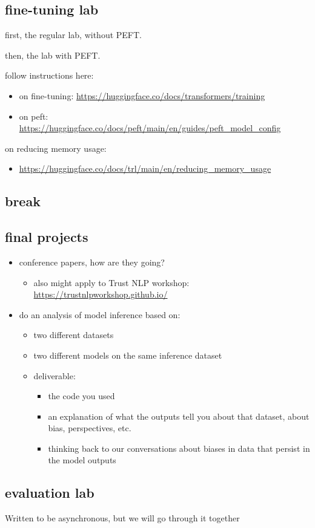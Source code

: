 \documentclass[11pt]{article}
\begin{document}
\subsection{fine-tuning lab}
\label{sec:orge7ab9a6}
first, the regular lab, without PEFT.

then, the lab with PEFT. 

follow instructions here:
\begin{itemize}
\item on fine-tuning: \url{https://huggingface.co/docs/transformers/training}
\item on peft:
\url{https://huggingface.co/docs/peft/main/en/guides/peft\_model\_config}
\end{itemize}

on reducing memory usage:
\begin{itemize}
\item \url{https://huggingface.co/docs/trl/main/en/reducing\_memory\_usage}
\end{itemize}


\subsection{break}
\label{sec:org887bc90}

\subsection{final projects}
\label{sec:org1897cac}
\begin{itemize}
\item conference papers, how are they going? 
\begin{itemize}
\item also might apply to Trust NLP workshop:
\url{https://trustnlpworkshop.github.io/}
\end{itemize}
\item do an analysis of model inference based on:
\begin{itemize}
\item two different datasets
\item two different models on the same inference dataset
\item deliverable:
\begin{itemize}
\item the code you used
\item an explanation of what the outputs tell you about that dataset,
about bias, perspectives, etc.
\item thinking back to our conversations about biases in data that
persist in the model outputs
\end{itemize}
\end{itemize}
\end{itemize}

\subsection{evaluation lab}
\label{sec:org60c9bb1}
Written to be asynchronous, but we will go through it together
\end{document}
